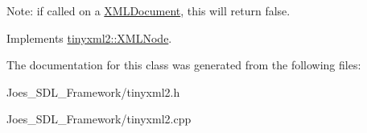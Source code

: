 Note\-: if called on a \hyperlink{classtinyxml2_1_1_x_m_l_document}{X\-M\-L\-Document}, this will return false. 

Implements \hyperlink{classtinyxml2_1_1_x_m_l_node_a7ce18b751c3ea09eac292dca264f9226}{tinyxml2\-::\-X\-M\-L\-Node}.



The documentation for this class was generated from the following files\-:\begin{DoxyCompactItemize}
\item 
Joes\-\_\-\-S\-D\-L\-\_\-\-Framework/tinyxml2.\-h\item 
Joes\-\_\-\-S\-D\-L\-\_\-\-Framework/tinyxml2.\-cpp\end{DoxyCompactItemize}

